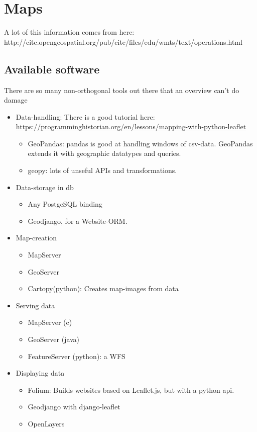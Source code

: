 \section{Maps}

A lot of this information comes from here: http://cite.opengeospatial.org/pub/cite/files/edu/wmts/text/operations.html

\subsection{Available software} 

There are so many non-orthogonal tools out there that an overview can't do damage

\begin{itemize}
    \item Data-handling: There is a good tutorial here: \href{https://programminghistorian.org/en/lessons/mapping-with-python-leaflet}{https://programminghistorian.org/en/lessons/mapping-with-python-leaflet}
        \begin{itemize}
            \item GeoPandas: pandas is good at handling windows of csv-data. GeoPandas extends it with geographic datatypes and queries. 
            \item geopy: lots of unseful APIs and transformations.
        \end{itemize}
    \item Data-storage in db
        \begin{itemize}
            \item Any PostgeSQL binding
            \item Geodjango, for a Website-ORM.
        \end{itemize}
    \item Map-creation
        \begin{itemize}
            \item MapServer
            \item GeoServer
            \item Cartopy(python): Creates map-images from data
        \end{itemize}
    \item Serving data
        \begin{itemize}
            \item MapServer (c)
            \item GeoServer (java)
            \item FeatureServer (python): a WFS 
        \end{itemize}
    \item Displaying data
        \begin{itemize}
            \item Folium: Builds websites based on Leaflet.js, but with a python api.
            \item Geodjango with django-leaflet
            \item OpenLayers
        \end{itemize}
\end{itemize}




